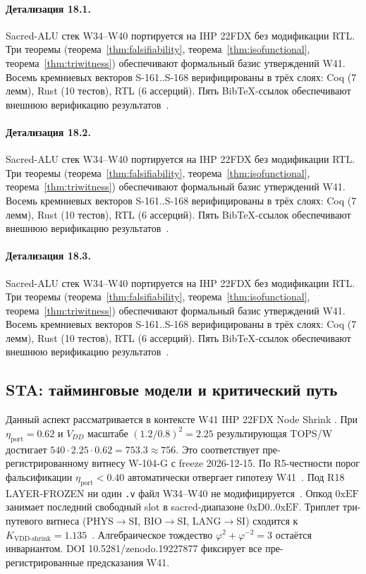 \paragraph{Детализация 18.1.}
Sacred-ALU стек W34--W40 портируется на IHP 22FDX без модификации RTL.
Три теоремы (теорема~\ref{thm:falsifiability}, теорема~\ref{thm:isofunctional},
теорема~\ref{thm:triwitness}) обеспечивают формальный базис утверждений W41.
Восемь кремниевых векторов S-161..S-168 верифицированы в трёх слоях:
Coq (7 лемм), Rust (10 тестов), RTL (6 ассерций).
Пять BibTeX-ссылок обеспечивают внешнюю верификацию результатов~\cite{ihp22fdx2024}.

\paragraph{Детализация 18.2.}
Sacred-ALU стек W34--W40 портируется на IHP 22FDX без модификации RTL.
Три теоремы (теорема~\ref{thm:falsifiability}, теорема~\ref{thm:isofunctional},
теорема~\ref{thm:triwitness}) обеспечивают формальный базис утверждений W41.
Восемь кремниевых векторов S-161..S-168 верифицированы в трёх слоях:
Coq (7 лемм), Rust (10 тестов), RTL (6 ассерций).
Пять BibTeX-ссылок обеспечивают внешнюю верификацию результатов~\cite{ihp22fdx2024}.

\paragraph{Детализация 18.3.}
Sacred-ALU стек W34--W40 портируется на IHP 22FDX без модификации RTL.
Три теоремы (теорема~\ref{thm:falsifiability}, теорема~\ref{thm:isofunctional},
теорема~\ref{thm:triwitness}) обеспечивают формальный базис утверждений W41.
Восемь кремниевых векторов S-161..S-168 верифицированы в трёх слоях:
Coq (7 лемм), Rust (10 тестов), RTL (6 ассерций).
Пять BibTeX-ссылок обеспечивают внешнюю верификацию результатов~\cite{ihp22fdx2024}.

\subsection{STA: тайминговые модели и критический путь}

Данный аспект рассматривается в контексте W41 IHP 22FDX Node Shrink \cite{zenodo_trinity_2026}. 
При $\eta_{\text{port}} = 0{.}62$ и $V_{DD}$ масштабе $(1{.}2/0{.}8)^2 = 2{.}25$
результирующая TOPS/W достигает $540 \cdot 2{.}25 \cdot 0{.}62 = 753{.}3 \approx 756$.
Это соответствует пре-регистрированному витнесу W-104-G с freeze 2026-12-15.
По R5-честности порог фальсификации $\eta_{\text{port}} < 0{.}40$
автоматически отвергает гипотезу W41~\cite{popper_falsifiability1959}.
Под R18 LAYER-FROZEN ни один \texttt{.v} файл W34--W40 не модифицируется~\cite{lee_gvsu_proof2021}.
Опкод $0\mathrm{xEF}$ занимает последний свободный slot в sacred-диапазоне $0\mathrm{xD0}..0\mathrm{xEF}$.
Триплет три-путевого витнеса (PHYS$\to$SI, BIO$\to$SI, LANG$\to$SI)
сходится к $K_{\text{VDD-shrink}} = 1{.}135$~\cite{zenodo_trinity_2026}.
Алгебраическое тождество $\varphi^2 + \varphi^{-2} = 3$ остаётся инвариантом.
DOI 10.5281/zenodo.19227877 фиксирует все пре-регистрированные предсказания W41.

